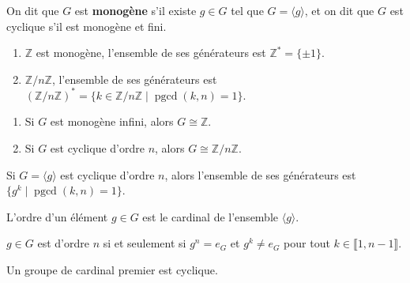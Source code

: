 	\begin{definition}
		On dit que $G$ est \textbf{monogène} s'il existe $g \in G$ tel que $G = \langle g \rangle$, et on dit que $G$ est cyclique s'il est monogène et fini.
	\end{definition}
	
	\begin{example}
		\begin{enumerate}[label=(\roman*)]
			\item $\mathbb{Z}$ est monogène, l'ensemble de ses générateurs est $\mathbb{Z}^* = \{ \pm 1 \}$.
			\item $\mathbb{Z}/n\mathbb{Z}$, l'ensemble de ses générateurs est $(\mathbb{Z}/n\mathbb{Z})^* = \{ k \in \mathbb{Z}/n\mathbb{Z} \mid \operatorname{pgcd}(k,n) = 1 \}$.
		\end{enumerate}
	\end{example}
	
	\begin{theorem}
		\begin{enumerate}[label=(\roman*)]
			\item Si $G$ est monogène infini, alors $G \cong \mathbb{Z}$.
			\item Si $G$ est cyclique d'ordre $n$, alors $G \cong \mathbb{Z}/n\mathbb{Z}$.
		\end{enumerate}
	\end{theorem}
	
	\begin{corollary}
		Si $G = \langle g \rangle$ est cyclique d'ordre $n$, alors l'ensemble de ses générateurs est $\{ g^k \mid \operatorname{pgcd}(k,n) = 1 \}$.
	\end{corollary}
	
	
	\begin{definition}
		L'ordre d'un élément $g \in G$ est le cardinal de l'ensemble $\langle g \rangle$.
	\end{definition}
	
	\begin{remark}
		$g \in G$ est d'ordre $n$ si et seulement si $g^n = e_G$ et $g^k \neq e_G$ pour tout $k \in \llbracket 1,n-1 \rrbracket$.
	\end{remark}
	
	
	\begin{proposition}
		Un groupe de cardinal premier est cyclique.
	\end{proposition}
	

